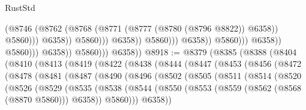 \begin{lexlean}{RustStd}
\begin{coremodule}
                                                          (@8746
                                                            (@8762
                                                              (@8768
                                                                (@8771
                                                                  (@8777
                                                                    (@8780 (@8796 @8822))
                                                                    @6358))
                                                                @5860)))
                                                          @6358))
                                                      @5860)))
                                                @6358))
                                            @5860)))
                                      @6358))
                                  @5860)))
                            @6358))
                        @5860)))
                  @6358))
              @5860)))
        @6358))
@8918 := @8379
    (@8385
      (@8388
        (@8404
          (@8410
            (@8413
              (@8419
                (@8422
                  (@8438
                    (@8444
                      (@8447
                        (@8453
                          (@8456
                            (@8472
                              (@8478
                                (@8481
                                  (@8487
                                    (@8490
                                      (@8496
                                        (@8502
                                          (@8505
                                            (@8511
                                              (@8514
                                                (@8520
                                                  (@8526
                                                    (@8529
                                                      (@8535
                                                        (@8538
                                                          (@8544
                                                            (@8550
                                                              (@8553
                                                                (@8559
                                                                  (@8562 (@8568 (@8870 @5860)))
                                                                  @6358))
                                                              @5860)))
                                                        @6358))

\end{coremodule}
\end{lexlean}

